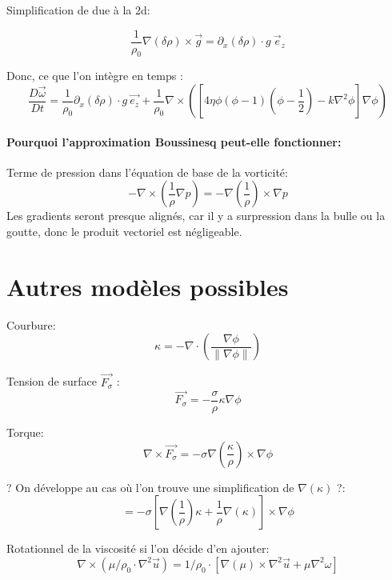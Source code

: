 \documentclass[10pt,a4paper]{article}
\begin{document}
Simplification de  due à la 2d: 

\[  \dfrac{1}{\rho_0} \nabla (\delta \rho) \times \vec{g} = \partial_x (\delta \rho) \cdot g~\vec{e}_z \]


Donc, ce que l'on intègre en temps :
\[
	\dfrac{D \vec{\omega}}{D t} = \dfrac{1}{\rho_0} \partial_x (\delta \rho ) \cdot g ~\vec{e_z} + \dfrac{1}{\rho_0} \nabla \times \left( \left[ 4 \eta \phi (\phi - 1) \left(\phi - \dfrac{1}{2} \right) - k\nabla^2 \phi \right] \nabla \phi\right)
\]

\paragraph{Pourquoi l'approximation Boussinesq peut-elle fonctionner:}
Terme de pression dans l'équation de base de la vorticité:
\[ -\nabla \times \left( \frac{1}{\rho} \nabla p \right) = -\nabla \left( \frac{1}{\rho} \right) \times \nabla p \] 
Les gradients seront presque alignés, car il y a surpression dans la bulle ou la goutte, donc le produit vectoriel est négligeable.

\section{Autres modèles possibles}



Courbure:
\[ \kappa = - \nabla \cdot \left( \frac{\nabla\phi}{\left\| \nabla \phi \right\|} \right) \] 

Tension de surface $\vec{F_{\sigma}}$ :
\[ \vec{F_{\sigma}}= - \frac{\sigma}{\rho} \kappa \nabla \phi \]

Torque:
\[ \nabla \times \vec{F_{\sigma}} = - \sigma\nabla\left( \frac{\kappa}{\rho}\right)\times \nabla \phi \]

? On développe au cas où l'on trouve une simplification de $\nabla(\kappa)$ ?:
\[ =-\sigma \left[ \nabla\left( \frac{1}{\rho}\right)\kappa + \frac{1}{\rho} \nabla(\kappa) \right]\times \nabla\phi \]

Rotationnel de la viscosité si l'on décide d'en ajouter:
\[
\nabla\times (\mu/\rho_0\cdot\nabla^2\vec{u}) = 1/\rho_0 \cdot \left[ \nabla(\mu) \times \nabla^2\vec{u} + \mu \nabla^2\omega \right]
\]
\end{document}
